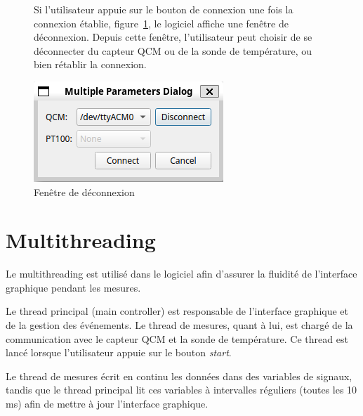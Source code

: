 \begin{figure}[H]
    \begin{minipage}{0.64\textwidth}
        Si l'utilisateur appuie sur le bouton de connexion une fois la connexion établie, figure~\ref{fig:disconnect window}, le logiciel affiche une fenêtre de déconnexion.
        Depuis cette fenêtre, l'utilisateur peut choisir de se déconnecter du capteur QCM ou de la sonde de température, ou bien rétablir la connexion.
    \end{minipage}\hfill
    \begin{minipage}{0.30\textwidth}
        \centering
        \includegraphics[width=\textwidth]{assets/figures/Disconnect.png}
        \caption{Fenêtre de déconnexion}
        \label{fig:disconnect window}
    \end{minipage}
\end{figure}

\section{Multithreading}

Le multithreading est utilisé dans le logiciel afin d'assurer la fluidité de l'interface graphique pendant les mesures.  

Le thread principal (main controller) est responsable de l'interface graphique et de la gestion des événements.  
Le thread de mesures, quant à lui, est chargé de la communication avec le capteur QCM et la sonde de température.  
Ce thread est lancé lorsque l'utilisateur appuie sur le bouton \textit{start}.  

Le thread de mesures écrit en continu les données dans des variables de signaux, tandis que le thread principal lit ces variables à intervalles réguliers (toutes les 10 ms) afin de mettre à jour l'interface graphique.

